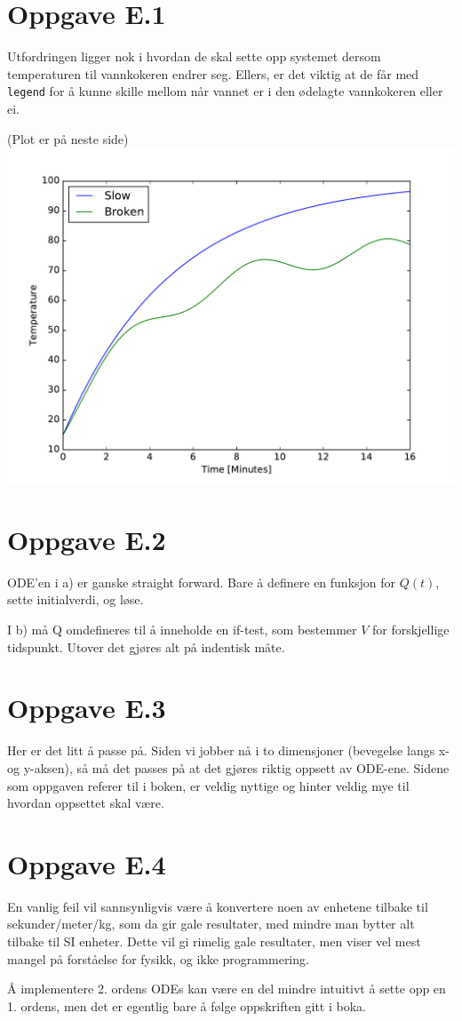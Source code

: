 \documentclass[10pt,a4paper]{article}
\begin{document}
\section*{Oppgave E.1}
Utfordringen ligger nok i hvordan de skal sette opp systemet dersom temperaturen til vannkokeren endrer seg. Ellers, er det viktig at de får med \texttt{legend} for å kunne skille mellom når vannet er i den ødelagte vannkokeren eller ei. 

(Plot er på neste side) \hfill \\
\includegraphics[scale=.75]{fig_boiling_water.pdf}

\newpage
\section*{Oppgave E.2}
ODE'en i a) er ganske straight forward. Bare å definere en funksjon for $Q(t)$, sette initialverdi, og løse.

I b) må Q omdefineres til å inneholde en if-test, som bestemmer $V$ for forskjellige tidspunkt. Utover det gjøres alt på indentisk måte.



\newpage
\section*{Oppgave E.3}
Her er det litt å passe på. Siden vi jobber nå i to dimensjoner (bevegelse langs x- og y-aksen), så må det passes på at det gjøres riktig oppsett av ODE-ene. Sidene som oppgaven referer til i boken, er veldig nyttige og hinter veldig mye til hvordan oppsettet skal være. 



\newpage
\section*{Oppgave E.4}
En vanlig feil vil sannsynligvis være å konvertere noen av enhetene tilbake til sekunder/meter/kg, som da gir gale resultater, med mindre man bytter alt tilbake til SI enheter. Dette vil gi rimelig gale resultater, men viser vel mest mangel på forståelse for fysikk, og ikke programmering.

Å implementere 2. ordens ODEs kan være en del mindre intuitivt å sette opp en 1. ordens, men det er egentlig bare å følge oppskriften gitt i boka. 

\end{document}
